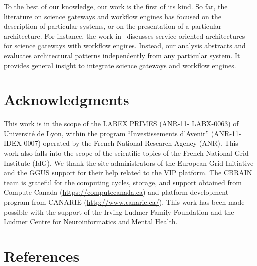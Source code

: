 \documentclass[preprint,3p,twocolumn]{elsarticle}
\newcommand{\closedanswerednote}[6]{}
\begin{document}
To the best of our knowledge, our work is the first of its kind. So
far, the literature on science gateways and workflow engines has
focused on the description of particular systems, or on the
presentation of a particular architecture. For instance, the work
in~\cite{Gannon2005} discusses service-oriented architectures for
science gateways with workflow engines.  Instead, our analysis
abstracts and evaluates architectural patterns independently from any
particular system. It provides general insight to integrate science
gateways and workflow engines.


\section{Acknowledgments}

This work is in the scope of the LABEX PRIMES (ANR-11- LABX-0063) of
Universit\'e de Lyon, within the program ``Investissements d’Avenir''
(ANR-11-IDEX-0007) operated by the French National Research Agency
(ANR). This work also falls into the scope of the scientific topics of
the French National Grid Institute (IdG). We thank the site
administrators of the European Grid Initiative and the GGUS support
for their help related to the VIP platform. The CBRAIN team is grateful for the
computing cycles, storage, and support obtained from Compute Canada
(\url{https://computecanada.ca}) and platform development program from CANARIE
 (\url{http://www.canarie.ca/}). This work has been made possible with the support of the Irving Ludmer Family Foundation and
the Ludmer Centre for Neuroinformatics and Mental Health. \closedanswerednote{Marc-e}{Would it be proper to thank EGI?
  Compute Canada? CANARIE?}{Tristan}{Added EGI and Compute Canada. Not sure if
  Canarie should be added. What about Calcul QC?}{Marc-e}{CQ, no. CANARIE, I'd
  say yes since they funded a major chunk of CBRAIN's development.}

\section*{References}

\enlargethispage{5mm}


\end{document}
